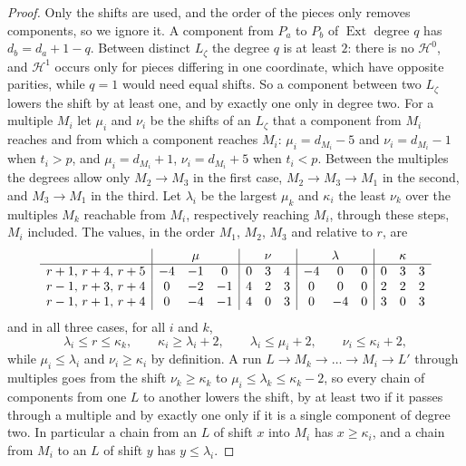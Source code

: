 \documentclass[11pt,reqno]{amsart}
\theoremstyle{plain}
\theoremstyle{definition}
\theoremstyle{remark}
\newcommand{\cH}{\mathcal{H}}
\DeclareMathOperator{\Ext}{Ext}
\begin{document}
\begin{proof}
Only the shifts are used, and the order of the pieces only removes
components, so we ignore it. A component from $P_{a}$ to $P_{b}$ of $\Ext$
degree $q$ has $d_{b}=d_{a}+1-q$. Between distinct $L_{\zeta}$ the degree $q$
is at least $2$: there is no $\cH^{0}$, and $\cH^{1}$ occurs only for pieces
differing in one coordinate, which have opposite parities, while $q=1$ would
need equal shifts. So a component between two $L_{\zeta}$ lowers the shift
by at least one, and by exactly one only in degree two. For a multiple
$M_{i}$ let $\mu_{i}$ and $\nu_{i}$ be the shifts of an $L_{\zeta}$ that a
component from $M_{i}$ reaches and from which a component reaches $M_{i}$:
$\mu_{i}=d_{M_{i}}-5$ and $\nu_{i}=d_{M_{i}}-1$ when $t_{i}>p$, and
$\mu_{i}=d_{M_{i}}+1$, $\nu_{i}=d_{M_{i}}+5$ when $t_{i}<p$. Between the
multiples the degrees allow only $M_{2}\to M_{3}$ in the first case,
$M_{2}\to M_{3}\to M_{1}$ in the second, and $M_{3}\to M_{1}$ in the third.
Let $\lambda_{i}$ be the largest $\mu_{k}$ and $\kappa_{i}$ the least
$\nu_{k}$ over the multiples $M_{k}$ reachable from $M_{i}$, respectively
reaching $M_{i}$, through these steps, $M_{i}$ included. The values, in the
order $M_{1}$, $M_{2}$, $M_{3}$ and relative to $r$, are
\[
\begin{array}{l|ccc|ccc|ccc|ccc}
 & \multicolumn{3}{c|}{\mu} & \multicolumn{3}{c|}{\nu}
 & \multicolumn{3}{c|}{\lambda} & \multicolumn{3}{c}{\kappa}\\
\hline
r+1,\,r+4,\,r+5 & -4&-1&0 & 0&3&4 & -4&0&0 & 0&3&3\\
r-1,\,r+3,\,r+4 & 0&-2&-1 & 4&2&3 & 0&0&0 & 2&2&2\\
r-1,\,r+1,\,r+4 & 0&-4&-1 & 4&0&3 & 0&-4&0 & 3&0&3
\end{array}
\]
and in all three cases, for all $i$ and $k$,
\begin{equation}\label{eq:allthree}
  \lambda_{i}\le r\le\kappa_{k},\qquad
  \kappa_{i}\ge\lambda_{i}+2,\qquad
  \lambda_{i}\le\mu_{i}+2,\qquad
  \nu_{i}\le\kappa_{i}+2,
\end{equation}
while $\mu_{i}\le\lambda_{i}$ and $\nu_{i}\ge\kappa_{i}$ by definition. A
run $L\to M_{k}\to\dots\to M_{i}\to L'$ through multiples goes from the shift
$\nu_{k}\ge\kappa_{k}$ to $\mu_{i}\le\lambda_{k}\le\kappa_{k}-2$, so every chain
of components from one $L$ to another lowers the shift, by at least two if it
passes through a multiple and by exactly one only if it is a single component
of degree two. In particular a chain from an $L$ of shift $x$ into $M_{i}$
has $x\ge\kappa_{i}$, and a chain from $M_{i}$ to an $L$ of shift $y$ has
$y\le\lambda_{i}$.


\end{proof}
\end{document}
